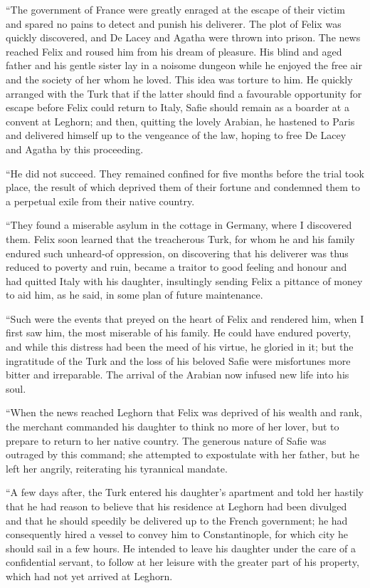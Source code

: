 \documentclass[12pt,openright]{book}
\begin{document}
“The government of France were greatly enraged at the escape of their victim and spared no pains to detect and punish his deliverer. The plot of Felix was quickly discovered, and De Lacey and Agatha were thrown into prison. The news reached Felix and roused him from his dream of pleasure. His blind and aged father and his gentle sister lay in a noisome dungeon while he enjoyed the free air and the society of her whom he loved. This idea was torture to him. He quickly arranged with the Turk that if the latter should find a favourable opportunity for escape before Felix could return to Italy, Safie should remain as a boarder at a convent at Leghorn; and then, quitting the lovely Arabian, he hastened to Paris and delivered himself up to the vengeance of the law, hoping to free De Lacey and Agatha by this proceeding.

“He did not succeed. They remained confined for five months before the trial took place, the result of which deprived them of their fortune and condemned them to a perpetual exile from their native country.

“They found a miserable asylum in the cottage in Germany, where I discovered them. Felix soon learned that the treacherous Turk, for whom he and his family endured such unheard-of oppression, on discovering that his deliverer was thus reduced to poverty and ruin, became a traitor to good feeling and honour and had quitted Italy with his daughter, insultingly sending Felix a pittance of money to aid him, as he said, in some plan of future maintenance.

“Such were the events that preyed on the heart of Felix and rendered him, when I first saw him, the most miserable of his family. He could have endured poverty, and while this distress had been the meed of his virtue, he gloried in it; but the ingratitude of the Turk and the loss of his beloved Safie were misfortunes more bitter and irreparable. The arrival of the Arabian now infused new life into his soul.

“When the news reached Leghorn that Felix was deprived of his wealth and rank, the merchant commanded his daughter to think no more of her lover, but to prepare to return to her native country. The generous nature of Safie was outraged by this command; she attempted to expostulate with her father, but he left her angrily, reiterating his tyrannical mandate.

“A few days after, the Turk entered his daughter’s apartment and told her hastily that he had reason to believe that his residence at Leghorn had been divulged and that he should speedily be delivered up to the French government; he had consequently hired a vessel to convey him to Constantinople, for which city he should sail in a few hours. He intended to leave his daughter under the care of a confidential servant, to follow at her leisure with the greater part of his property, which had not yet arrived at Leghorn.
\end{document}
